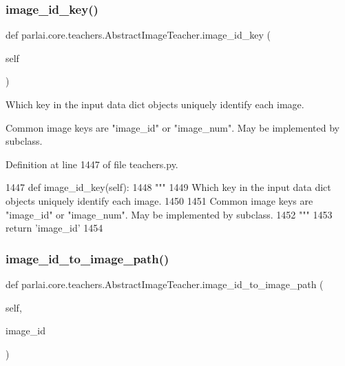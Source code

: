 \subsubsection{\texorpdfstring{image\+\_\+id\+\_\+key()}{image\_id\_key()}}
{\footnotesize\ttfamily def parlai.\+core.\+teachers.\+Abstract\+Image\+Teacher.\+image\+\_\+id\+\_\+key (\begin{DoxyParamCaption}\item[{}]{self }\end{DoxyParamCaption})}

\begin{DoxyVerb}Which key in the input data dict objects uniquely identify each image.

Common image keys are "image_id" or "image_num". May be implemented by subclass.
\end{DoxyVerb}
 

Definition at line 1447 of file teachers.\+py.


\begin{DoxyCode}
1447     \textcolor{keyword}{def }image\_id\_key(self):
1448         \textcolor{stringliteral}{"""}
1449 \textcolor{stringliteral}{        Which key in the input data dict objects uniquely identify each image.}
1450 \textcolor{stringliteral}{}
1451 \textcolor{stringliteral}{        Common image keys are "image\_id" or "image\_num". May be implemented by subclass.}
1452 \textcolor{stringliteral}{        """}
1453         \textcolor{keywordflow}{return} \textcolor{stringliteral}{'image\_id'}
1454 
\end{DoxyCode}
\mbox{\label{classparlai_1_1core_1_1teachers_1_1AbstractImageTeacher_aa75286450850638274d7f076a81f7e90}} 
\subsubsection{\texorpdfstring{image\+\_\+id\+\_\+to\+\_\+image\+\_\+path()}{image\_id\_to\_image\_path()}}
{\footnotesize\ttfamily def parlai.\+core.\+teachers.\+Abstract\+Image\+Teacher.\+image\+\_\+id\+\_\+to\+\_\+image\+\_\+path (\begin{DoxyParamCaption}\item[{}]{self,  }\item[{}]{image\+\_\+id }\end{DoxyParamCaption})}

